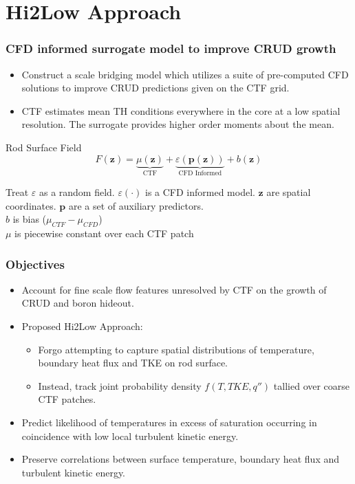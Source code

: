 \documentclass[t, pdftex]{beamer}
\begin{document}
\section{Hi2Low Approach}
\begin{frame}
    \frametitle{CFD informed surrogate model to improve CRUD growth}
    \begin{itemize}
    \item Construct a scale bridging model which utilizes a suite of pre-computed CFD solutions to improve CRUD predictions given on the CTF grid. 
    \item CTF estimates mean TH conditions everywhere in the core at a low spatial resolution.  The surrogate provides higher order moments about the mean.
    \end{itemize}
    \begin{block}{Rod Surface Field}
        \[ 
        F(\mathbf z) = \underbrace{\mu(\mathbf{z})}_\text{CTF} + \underbrace{\varepsilon({\mathbf p(\mathbf z)})}_\text{CFD Informed} + b(\mathbf{z})
        \]
    \end{block}
    Treat $\varepsilon$ as a random field.  $\varepsilon(\cdot)$ is a CFD informed model. $\mathbf z$ are spatial coordinates. $\mathbf p$ are a set of auxiliary predictors. \\
    $b$ is bias ($\mu_{CTF} - \mu_{CFD}$) \\
    $\mu$ is piecewise constant over each CTF patch
\end{frame}

\begin{frame}\frametitle{Objectives}
\begin{itemize}
\item Account for fine scale flow features unresolved by CTF on the growth of CRUD and boron hideout.
\item Proposed Hi2Low Approach:
\begin{itemize}
	\item Forgo attempting to capture spatial distributions of temperature, boundary heat flux and TKE on rod surface. 
	\item Instead, track joint probability density $f(T, TKE, q'')$ tallied over coarse CTF patches.
\end{itemize}
	\item Predict likelihood of temperatures in excess of saturation occurring in coincidence with low local turbulent kinetic energy.
	\item Preserve correlations between surface temperature, boundary heat flux and turbulent kinetic energy.
\end{itemize}
\end{frame}
\end{document}
